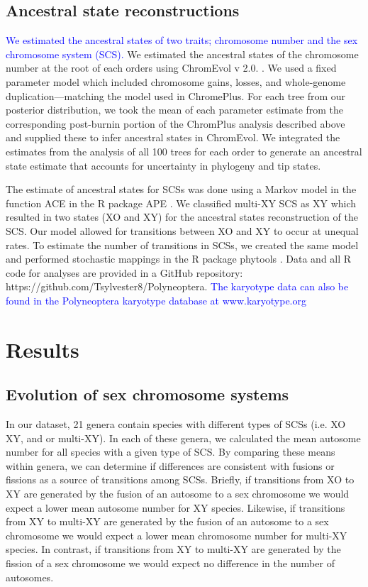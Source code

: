 \documentclass[]{rsos}%
\begin{document}
\subsection{Ancestral state reconstructions}
\textcolor{blue}{We estimated the ancestral states of two traits; chromosome number and the sex chromosome system (SCS).}
We estimated the ancestral states of the chromosome number at the root of each orders using ChromEvol v 2.0. \cite{glick2014chromevol, mayrose2009chromevol}.
We used a fixed parameter model which included chromosome gains, losses, and whole-genome duplication---matching the model used in ChromePlus.
For each tree from our posterior distribution, we took the mean of each parameter estimate from the corresponding post-burnin portion of the ChromPlus analysis described above and supplied these to infer ancestral states in ChromEvol.
We integrated the estimates from the analysis of all 100 trees for each order to generate an ancestral state estimate that accounts for uncertainty in phylogeny and tip states. 

The estimate of ancestral states for SCSs was done using a Markov model in the function ACE in the R package APE \cite{Paradis2018}.
We classified multi-XY SCS as XY which resulted in two states (XO and XY) for the ancestral states reconstruction of the SCS. 
Our model allowed for transitions between XO and XY to occur at unequal rates.
To estimate the number of transitions in SCSs, we created the same model and performed stochastic mappings in the R package phytools \cite{revell2012phytools}.
Data and all R code for analyses are provided in a GitHub repository: https://github.com/Tsylvester8/Polyneoptera. 
\textcolor{blue}{The karyotype data can also be found in the Polyneoptera karyotype database at www.karyotype.org}

\section{Results}

\subsection{Evolution of sex chromosome systems}
In our dataset, 21 genera contain species with different types of SCSs (i.e. XO XY, and or multi-XY).
In each of these genera, we calculated the mean autosome number for all species with a given type of SCS.
By comparing these means within genera, we can determine if differences are consistent with fusions or fissions as a source of transitions among SCSs.
Briefly, if transitions from XO to XY are generated by the fusion of an autosome to a sex chromosome we would expect a lower mean autosome number for XY species.
Likewise, if transitions from XY to multi-XY are generated by the fusion of an autosome to a sex chromosome we would expect a lower mean chromosome number for multi-XY species.
In contrast, if transitions from XY to multi-XY are generated by the fission of a sex chromosome we would expect no difference in the number of autosomes.
\end{document}
